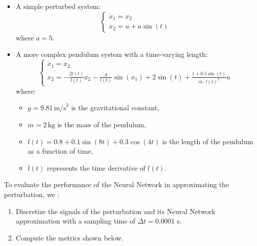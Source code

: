 \begin{itemize}
    \item A simple perturbed system:
    \begin{equation}
        \begin{cases}
            \dot{x}_1 = x_2 \\
            \dot{x}_2 = u + a \sin(t)
        \end{cases}
    \end{equation}
    where \( a = 5 \).
    
    \item A more complex pendulum system with a time-varying length:
    \begin{equation}
        \begin{cases}
            \dot{x}_1 = x_2 \\
            \dot{x}_2 = -\frac{2 \dot{l}(t)}{l(t)} x_2 - \frac{g}{l(t)} \sin(x_1) + 2 \sin(t) + \frac{1 + 0.5 \sin(t)}{m \cdot l(t)^2} u
        \end{cases}
    \end{equation}
    where:
    \begin{itemize}
        \item \( g = 9.81 \, \text{m/s}^2 \) is the gravitational constant,
        \item \( m = 2 \, \text{kg} \) is the mass of the pendulum,
        \item \( l(t) = 0.8 + 0.1 \sin(8t) + 0.3 \cos(4t) \) is the length of the pendulum as a function of time,
        \item \( \dot{l}(t) \) represents the time derivative of \( l(t) \).
    \end{itemize}
\end{itemize}

To evaluate the performance of the Neural Network in approximating the perturbation, %
we :

\begin{enumerate}
    \item Discretize the signals of the perturbation and its Neural Network approximation %
with a sampling time of \( \Delta t = 0.0001 \) s.
    \item Compute the metrics shown below.
\end{enumerate}

